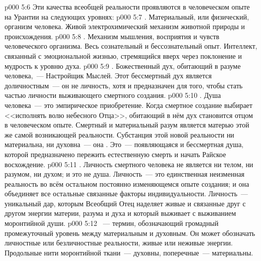 \vs p000 5:6 \pc Эти качества всеобщей реальности проявляются в человеческом опыте на Урантии на следующих уровнях:
\vs p000 5:7 . Материальный, или физический, организм человека. Живой электрохимический механизм животной природы и происхождения.
\vs p000 5:8 . Механизм мышления, восприятия и чувств человеческого организма. Весь сознательный и бессознательный опыт. Интеллект, связанный с эмоциональной жизнью, стремящийся вверх через поклонение и мудрость к уровню духа.
\vs p000 5:9 . Божественный дух, обитающий в разуме человека,~--- Настройщик Мыслей. Этот бессмертный дух является доличностным~--- он не личность, хотя и предназначен для того, чтобы стать частью личности выживающего смертного создания.
\vs p000 5:10 . Душа человека~--- это эмпирическое приобретение. Когда смертное создание выбирает <<исполнять волю небесного Отца>>, обитающий в нём дух становится отцом  в человеческом опыте. Смертный и материальный разум является матерью этой же самой возникающей реальности. Субстанция этой новой реальности ни материальна, ни духовна~--- она . Это~--- появляющаяся и бессмертная душа, которой предназначено пережить естественную смерть и начать Райское восхождение.
\vs p000 5:11 \pc {}. Личность смертного человека не является ни телом, ни разумом, ни духом; и это не душа. Личность~--- это единственная неизменная реальность во всём остальном постоянно изменяющемся опыте создания; и она объединяет все остальные связанные факторы индивидуальности. Личность~--- уникальный дар, которым Всеобщий Отец наделяет живые и связанные друг с другом энергии материи, разума и духа и который выживает с выживанием моронтийной души.
\vs p000 5:12 \pc {}~--- термин, обозначающий громадный промежуточный уровень между материальным и духовным. Он может обозначать личностные или безличностные реальности, живые или неживые энергии. Продольные нити моронтийной ткани~--- духовны, поперечные~--- материальны.
